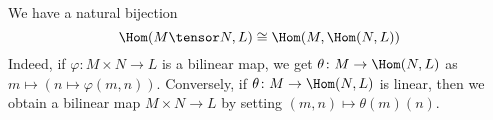 We have a natural bijection
\[ \Hom(M\tensor N, L) \cong \Hom(M, \Hom(N, L)) \]
Indeed, if $\varphi\colon M\times N\to L$ is a bilinear map, we get
$\theta\colon M\to \Hom(N, L)$ as $m\mapsto (n\mapsto \varphi(m, n))$.
Conversely, if $\theta\colon M\to \Hom(N, L)$ is linear, then we obtain
a bilinear map $M\times N\to L$ by setting $(m, n)\mapsto \theta(m)(n)$.
